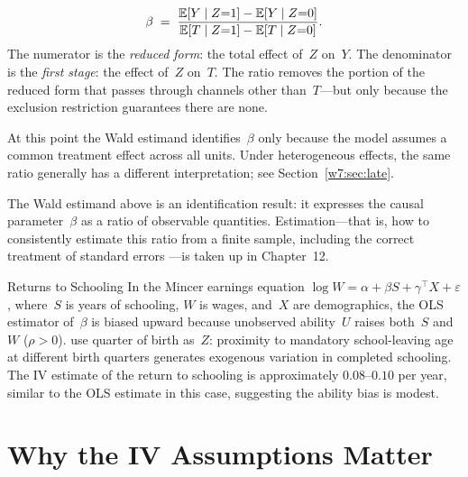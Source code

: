 \documentclass[master.tex]{subfiles}
\begin{document}
\begin{tcolorbox}[defstyle, title={The Wald Estimand}]
\label{w7:eq:wald}
\[
  \beta
  \;=\;
  \frac{\mathbb{E}[Y \mid Z{=}1] - \mathbb{E}[Y \mid Z{=}0]}
       {\mathbb{E}[T \mid Z{=}1] - \mathbb{E}[T \mid Z{=}0]}.
\]
The numerator is the \emph{reduced form}: the total effect of~$Z$
on~$Y$.  The denominator is the \emph{first stage}: the effect
of~$Z$ on~$T$.  The ratio removes the portion of the reduced form
that passes through channels other than~$T$---but only because
the exclusion restriction guarantees there are none.
\end{tcolorbox}

At this point the Wald estimand identifies~$\beta$ only because the
model assumes a common treatment effect across all units.  Under
heterogeneous effects, the same ratio generally has a different
interpretation; see Section~\ref{w7:sec:late}.

\begin{remark}
The Wald estimand above is an identification result: it expresses the
causal parameter~$\beta$ as a ratio of observable quantities.
Estimation---that is, how to consistently estimate this ratio from
a finite sample, including the correct treatment of standard errors
---is taken up in Chapter~12.
\end{remark}

\begin{example}{Returns to Schooling}
\label{w7:ex:returns}
In the Mincer earnings equation
$\log W = \alpha + \beta S + \gamma^\top X + \varepsilon$,
where~$S$ is years of schooling, $W$ is wages, and~$X$ are
demographics, the OLS estimator of~$\beta$ is biased upward because
unobserved ability~$U$ raises both~$S$ and~$W$ ($\rho > 0$).
\citet{angrist1991does} use quarter of birth as~$Z$: proximity
to mandatory school-leaving age at different birth quarters generates
exogenous variation in completed schooling.  The IV estimate of the
return to schooling is approximately $0.08$--$0.10$ per year,
similar to the OLS estimate in this case, suggesting the ability
bias is modest.
\end{example}


\section{Why the IV Assumptions Matter}
\label{w7:sec:why-matter}
\end{document}
